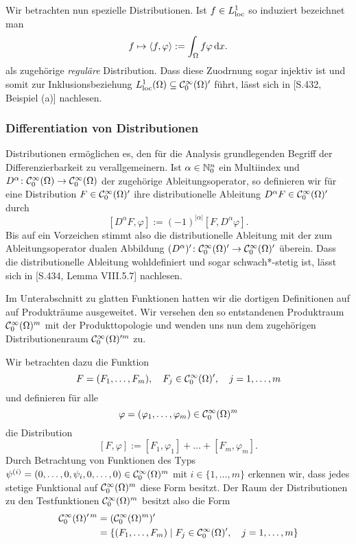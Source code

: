 Wir betrachten nun spezielle Distributionen.
Ist $f \in L^1_{\operatorname{loc}}$ so induziert bezeichnet man 
$$
f \mapsto \langle f, \varphi \rangle := \int_\Omega f \varphi \, {\operatorname{d}\!{x}}.
$$
als zugehörige \emph{reguläre} Distribution.
Dass diese Zuodrnung sogar injektiv ist und somit zur Inklusionsbeziehung $L^1_{\operatorname{loc}}(\Omega) \subseteq \mathcal{C}^\infty_0(\Omega)'$ führt, lässt sich in \cite{werner2011fa}[S.432, Beispiel (a)] nachlesen.

\subsubsection{Differentiation von Distributionen}

Distributionen ermöglichen es, den für die Analysis grundlegenden Begriff der Differenzierbarkeit zu verallgemeinern.
Ist $\alpha \in \mathbb{N}_0^n$ ein Multiindex und $D^\alpha \colon \mathcal{C}_0^\infty(\Omega) \to \mathcal{C}_0^\infty(\Omega)$ der zugehörige Ableitungsoperator, so definieren wir für eine Distribution $F \in \mathcal{C}_0^\infty(\Omega)'$ ihre distributionelle Ableitung $D^\alpha F \in \mathcal{C}_0^\infty(\Omega)'$ durch
$$
  [D^\alpha F, \varphi] := (-1)^{|\alpha|} [F, D^\alpha \varphi].
$$
Bis auf ein Vorzeichen stimmt also die distributionelle Ableitung mit der zum Ableitungsoperator dualen Abbildung $(D^\alpha)' \colon \mathcal{C}_0^\infty(\Omega)' \to \mathcal{C}_0^\infty(\Omega)'$ überein.
Dass die distributionelle Ableitung wohldefiniert und sogar schwach*-stetig ist, lässt sich in \cite{werner2011fa}[S.434, Lemma VIII.5.7] nachlesen.

Im Unterabschnitt zu glatten Funktionen hatten wir die dortigen Definitionen auf auf Produkträume ausgeweitet.
Wir versehen den so entstandenen Produktraum $\mathcal{C}_0^\infty(\Omega)^m$ mit der Produkttopologie und wenden uns nun dem zugehörigen Distributionenraum $\mathcal{C}_0^\infty(\Omega)'^m$ zu.

Wir betrachten dazu die Funktion
$$
  F = (F_1, \dots, F_m), \quad F_j \in \mathcal{C}_0^\infty(\Omega)', \quad j = 1, \dots, m
$$
und definieren für alle 
$$\varphi = (\varphi_1, \dots, \varphi_m) \in \mathcal{C}_0^\infty(\Omega)^m$$
die Distribution
$$
[F, \varphi] := [F_1, \varphi_1] + \dots + [F_m, \varphi_m].
$$
Durch Betrachtung von Funktionen des Typs $\psi^{(i)} = (0, \dots,0, \psi_i, 0,\dots,0) \in \mathcal{C}_0^\infty(\Omega)^m$ mit $i \in \{1,\dots,m\}$ erkennen wir, dass jedes stetige Funktional auf $\mathcal{C}_0^\infty(\Omega)^m$ diese Form besitzt.
Der Raum der Distributionen zu den Testfunktionen $\mathcal{C}_0^\infty(\Omega)^m$ besitzt also die Form
\begin{align*}
  \mathcal{C}_0^\infty(\Omega)'^{\,m}
  &= (\mathcal{C}_0^\infty(\Omega)^m)' \\
  &= \{(F_1,\dots,F_m) \mid F_j \in \mathcal{C}_0^\infty(\Omega)', \quad j = 1,\dots,m\}
\end{align*}

